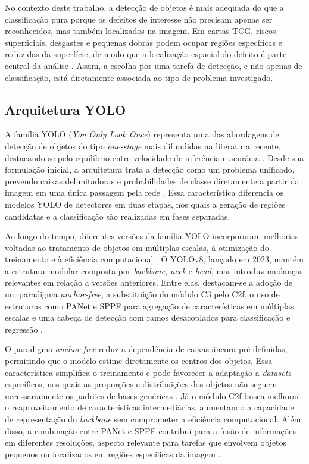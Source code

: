\documentclass[
    12pt,                %
    openright,           %
    oneside,             %
    a4paper,             %
    english,             %
    brazil               %
]{abntex2}
\begin{document}
No contexto deste trabalho, a detecção de objetos é mais adequada 
do que a classificação pura porque os defeitos de interesse não 
precisam apenas ser reconhecidos, mas também localizados na imagem. 
Em cartas TCG, riscos superficiais, desgastes e pequenas dobras podem 
ocupar regiões específicas e reduzidas da superfície, de modo que a 
localização espacial do defeito é parte central da análise 
\cite{Hussain2023, Ramos2025}. Assim, a escolha por uma tarefa de 
detecção, e não apenas de classificação, está diretamente associada 
ao tipo de problema investigado.


\subsection{Arquitetura YOLO}
\label{subsec:yolo}

A família YOLO (\textit{You Only Look Once}) representa uma das abordagens
de detecção de objetos do tipo \textit{one-stage} mais difundidas na literatura
recente, destacando-se pelo equilíbrio entre velocidade de inferência e acurácia
\cite{Ramos2025}. Desde sua formulação inicial, a arquitetura trata a detecção
como um problema unificado, prevendo caixas delimitadoras e probabilidades de
classe diretamente a partir da imagem em uma única passagem pela rede
\cite{Hussain2023}. Essa característica diferencia os modelos YOLO de detectores
em duas etapas, nos quais a geração de regiões candidatas e a classificação são
realizadas em fases separadas.

Ao longo do tempo, diferentes versões da família YOLO incorporaram melhorias
voltadas ao tratamento de objetos em múltiplas escalas, à otimização do
treinamento e à eficiência computacional \cite{Hussain2023,Ramos2025}. O YOLOv8,
lançado em 2023, mantém a estrutura modular composta por \textit{backbone},
\textit{neck} e \textit{head}, mas introduz mudanças relevantes em relação a versões
anteriores. Entre elas, destacam-se a adoção de um paradigma \textit{anchor-free},
a substituição do módulo C3 pelo C2f, o uso de estruturas como PANet e SPPF para
agregação de características em múltiplas escalas e uma cabeça de detecção com
ramos desacoplados para classificação e regressão \cite{Ramos2025}.

O paradigma \textit{anchor-free} reduz a dependência de caixas âncora
pré-definidas, permitindo que o modelo estime diretamente os centros dos objetos.
Essa característica simplifica o treinamento e pode favorecer a adaptação a
\textit{datasets} específicos, nos quais as proporções e distribuições dos objetos
não seguem necessariamente os padrões de bases genéricas \cite{Ramos2025}. Já o
módulo C2f busca melhorar o reaproveitamento de características intermediárias,
aumentando a capacidade de representação do \textit{backbone} sem comprometer a
eficiência computacional. Além disso, a combinação entre PANet e SPPF contribui
para a fusão de informações em diferentes resoluções, aspecto relevante para
tarefas que envolvem objetos pequenos ou localizados em regiões específicas da
imagem \cite{Ramos2025}.
\end{document}
